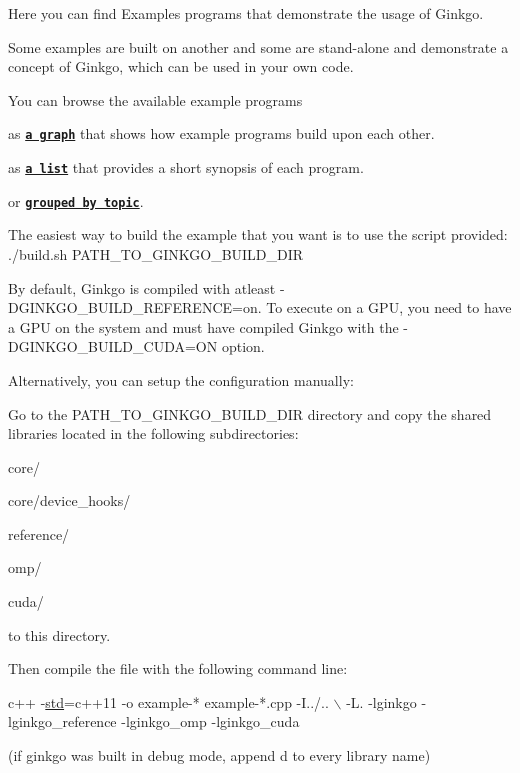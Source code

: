 Here you can find Examples programs that demonstrate the usage of Ginkgo.

Some examples are built on another and some are stand-\/alone and demonstrate a concept of Ginkgo, which can be used in your own code.

You can browse the available example programs 
\begin{DoxyEnumerate}
\item as {\bfseries \href{#graph}{\tt a graph}} that shows how example programs build upon each other. 
\item as {\bfseries \href{#list}{\tt a list}} that provides a short synopsis of each program. 
\item or {\bfseries \href{#topic}{\tt grouped by topic}}. 
\end{DoxyEnumerate}

The easiest way to build the example that you want is to use the script provided\+: {\ttfamily ./build.sh P\+A\+T\+H\+\_\+\+T\+O\+\_\+\+G\+I\+N\+K\+G\+O\+\_\+\+B\+U\+I\+L\+D\+\_\+\+D\+IR }

By default, Ginkgo is compiled with atleast {\ttfamily -\/\+D\+G\+I\+N\+K\+G\+O\+\_\+\+B\+U\+I\+L\+D\+\_\+\+R\+E\+F\+E\+R\+E\+N\+CE=on}. To execute on a G\+PU, you need to have a G\+PU on the system and must have compiled Ginkgo with the {\ttfamily -\/\+D\+G\+I\+N\+K\+G\+O\+\_\+\+B\+U\+I\+L\+D\+\_\+\+C\+U\+DA=ON} option.

Alternatively, you can setup the configuration manually\+:

Go to the {\ttfamily  P\+A\+T\+H\+\_\+\+T\+O\+\_\+\+G\+I\+N\+K\+G\+O\+\_\+\+B\+U\+I\+L\+D\+\_\+\+D\+IR } directory and copy the shared libraries located in the following subdirectories\+: 
\begin{DoxyEnumerate}
\item {\ttfamily core/} 
\item {\ttfamily core/device\+\_\+hooks/} 
\item {\ttfamily reference/} 
\item {\ttfamily omp/} 
\item {\ttfamily cuda/} 
\end{DoxyEnumerate}to this directory.

Then compile the file with the following command line\+: 
\begin{DoxyCode}
c++ -\hyperlink{namespacestd}{std}=c++11 -o example-* example-*.cpp -I../.. \(\backslash\)
-L. -lginkgo -lginkgo\_reference -lginkgo\_omp -lginkgo\_cuda
\end{DoxyCode}
 (if ginkgo was built in debug mode, append \textquotesingle{}d\textquotesingle{} to every library name)

